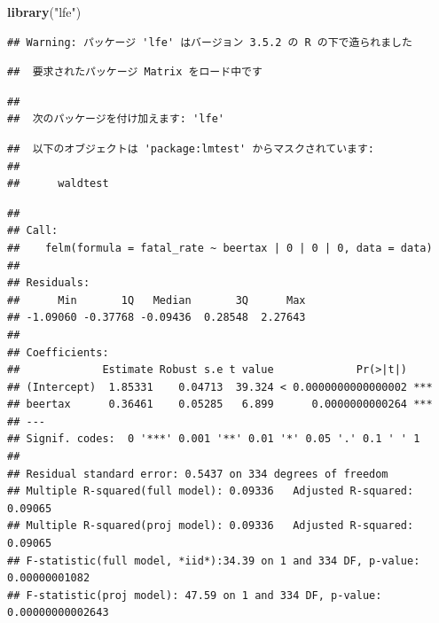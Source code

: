 \documentclass[]{book}
\newenvironment{Shaded}{\begin{snugshade}}{\end{snugshade}}
\newcommand{\KeywordTok}[1]{\textcolor[rgb]{0.13,0.29,0.53}{\textbf{#1}}}
\newcommand{\DataTypeTok}[1]{\textcolor[rgb]{0.13,0.29,0.53}{#1}}
\newcommand{\DecValTok}[1]{\textcolor[rgb]{0.00,0.00,0.81}{#1}}
\newcommand{\StringTok}[1]{\textcolor[rgb]{0.31,0.60,0.02}{#1}}
\newcommand{\CommentTok}[1]{\textcolor[rgb]{0.56,0.35,0.01}{\textit{#1}}}
\newcommand{\OtherTok}[1]{\textcolor[rgb]{0.56,0.35,0.01}{#1}}
\newcommand{\OperatorTok}[1]{\textcolor[rgb]{0.81,0.36,0.00}{\textbf{#1}}}
\newcommand{\NormalTok}[1]{#1}
\begin{document}
\begin{Shaded}
\begin{Highlighting}[]
\KeywordTok{library}\NormalTok{(}\StringTok{"lfe"}\NormalTok{)}
\end{Highlighting}
\end{Shaded}

\begin{verbatim}
## Warning: パッケージ 'lfe' はバージョン 3.5.2 の R の下で造られました
\end{verbatim}

\begin{verbatim}
##  要求されたパッケージ Matrix をロード中です
\end{verbatim}

\begin{verbatim}
## 
##  次のパッケージを付け加えます: 'lfe'
\end{verbatim}

\begin{verbatim}
##  以下のオブジェクトは 'package:lmtest' からマスクされています: 
## 
##      waldtest
\end{verbatim}

\begin{Shaded}
\end{Shaded}

\begin{verbatim}
## 
## Call:
##    felm(formula = fatal_rate ~ beertax | 0 | 0 | 0, data = data) 
## 
## Residuals:
##      Min       1Q   Median       3Q      Max 
## -1.09060 -0.37768 -0.09436  0.28548  2.27643 
## 
## Coefficients:
##             Estimate Robust s.e t value             Pr(>|t|)    
## (Intercept)  1.85331    0.04713  39.324 < 0.0000000000000002 ***
## beertax      0.36461    0.05285   6.899      0.0000000000264 ***
## ---
## Signif. codes:  0 '***' 0.001 '**' 0.01 '*' 0.05 '.' 0.1 ' ' 1
## 
## Residual standard error: 0.5437 on 334 degrees of freedom
## Multiple R-squared(full model): 0.09336   Adjusted R-squared: 0.09065 
## Multiple R-squared(proj model): 0.09336   Adjusted R-squared: 0.09065 
## F-statistic(full model, *iid*):34.39 on 1 and 334 DF, p-value: 0.00000001082 
## F-statistic(proj model): 47.59 on 1 and 334 DF, p-value: 0.00000000002643
\end{verbatim}
\end{document}
